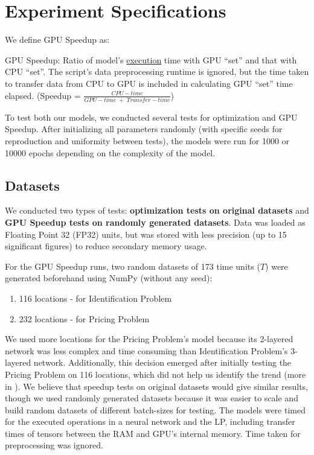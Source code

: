 \section{Experiment Specifications} \label{sec:Experiment Specifications}
We define GPU Speedup as:
\begin{mydef} \label{def:GPU Speedup}
    GPU Speedup: Ratio of model's \underline{execution} time with GPU ``set'' and that with CPU ``set''. The script's data preprocessing runtime is ignored, but the time taken to transfer data from CPU to GPU is included in calculating GPU ``set'' time elapsed. (Speedup = $\frac{CPU-time}{GPU-time\; +\; Transfer-time}$)
\end{mydef}

To test both our models, we conducted several tests for optimization and GPU Speedup. After initializing all parameters randomly (with specific seeds for reproduction and uniformity between tests), the models were run for 1000 or 10000 epochs depending on the complexity of the model.

\subsection{Datasets} \label{sec:Datasets}
We conducted two types of tests: \textbf{optimization tests on original datasets} and \textbf{GPU Speedup tests on randomly generated datasets}. Data was loaded as Floating Point 32 (FP32) units, but was stored with less precision (up to 15 significant figures) to reduce secondary memory usage.

For the GPU Speedup runs, two random datasets of 173 time units ($T$) were generated beforehand using NumPy (without any seed):
\begin{enumerate} 
    \item 116 locations - for Identification Problem
    \item 232 locations - for Pricing Problem
\end{enumerate}

We used more locations for the Pricing Problem's model because its 2-layered network was less complex and time consuming than Identification Problem's 3-layered network. Additionally, this decision emerged after initially testing the Pricing Problem on 116 locations, which did not help us identify the trend (more in ). We believe that speedup tests on original datasets would give similar results, though we used randomly generated datasets because it was easier to scale and build random datasets of different batch-sizes for testing. The models were timed for the executed operations in a neural network and the LP, including transfer times of tensors between the RAM and GPU's internal memory. Time taken for preprocessing was ignored. 

